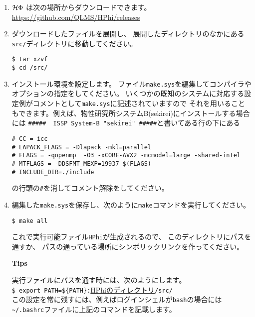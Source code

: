 
\begin{enumerate}

\item $\mathcal{H} \Phi$ は次の場所からダウンロードできます。\\
\url{https://github.com/QLMS/HPhi/releases}

\item ダウンロードしたファイルを展開し、
展開したディレクトリのなかにある\verb|src/|ディレクトリに移動してください。
\begin{verbatim}
$ tar xzvf 
$ cd /src/
\end{verbatim}

\item インストール環境を設定します。
  ファイル\verb|make.sys|を編集してコンパイラやオプションの指定をしてください。
  いくつかの既知のシステムに対応する設定例がコメントとして\verb|make.sys|に記述されていますので
  それを用いることもできます。例えば、物性研究所システムB(sekirei)にインストールする場合には
  \verb|#####  ISSP System-B "sekirei" #####|と書いてある行の下にある
\begin{verbatim}
# CC = icc
# LAPACK_FLAGS = -Dlapack -mkl=parallel 
# FLAGS = -qopenmp  -O3 -xCORE-AVX2 -mcmodel=large -shared-intel
# MTFLAGS = -DDSFMT_MEXP=19937 $(FLAGS)
# INCLUDE_DIR=./include
\end{verbatim}
の行頭の\verb|#|を消してコメント解除をしてください。

\item 編集した\verb|make.sys|を保存し、次のように\verb|make|コマンドを実行してください。
\begin{verbatim}
$ make all
\end{verbatim}

これで実行可能ファイル\verb|HPhi|が生成されるので、
このディレクトリにパスを通すか、
パスの通っている場所にシンボリックリンクを作ってください。

\begin{screen}
\Large 
{\bf Tips}
\normalsize

実行ファイルにパスを通す時には、次のようにします。
\\
\verb|$ export PATH=${PATH}:|\underline{HPhiのディレクトリ}\verb|/src/|
\\
この設定を常に残すには、例えばログインシェルが\verb|bash|の場合には
\verb|~/.bashrc|ファイルに上記のコマンドを記載します。

\end{screen}

\end{enumerate}
